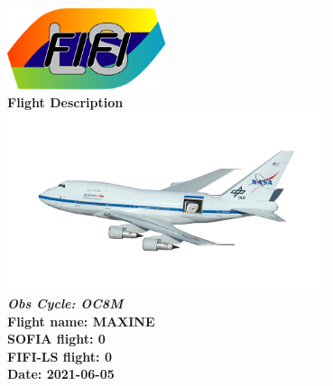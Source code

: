 \documentclass[10pt]{article}
\begin{document}
\begin{titlepage}
\begin{center}
\vspace*{1cm}
\includegraphics[width=0.35\textwidth]{../test/fifilogosmall}\\
\vspace{0.5cm}
{\Huge\bf Flight Description\\}
\vspace{1.cm}
\includegraphics[width=0.7\textwidth]{../test/sofia}\\
\vspace{2.cm}
\textbf{\sl\Large Obs Cycle: OC8M}\\
\vspace{0.5cm}
\textbf{\Large Flight name: MAXINE}\\
\vspace{0.5cm}
\textbf{\Large SOFIA flight: 0}\\
\vspace{0.5cm}
\textbf{\Large FIFI-LS flight: 0}\\
\vspace{0.5cm}
\textbf{\Large Date: 2021-06-05}\\
\vfill
\end{center}
\end{titlepage}
\end{document}

